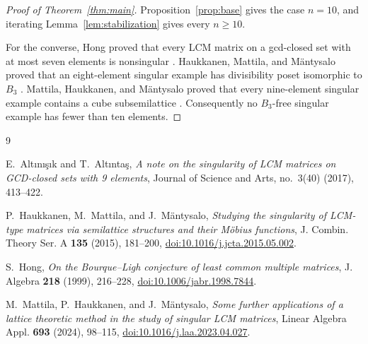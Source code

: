 \documentclass[11pt]{amsart}
\begin{document}
\begin{proof}[Proof of Theorem~\ref{thm:main}]
Proposition~\ref{prop:base} gives the case $n=10$, and iterating
Lemma~\ref{lem:stabilization} gives every $n\ge 10$.

For the converse, Hong proved that every LCM matrix on a gcd-closed
set with at most seven elements is nonsingular \cite{Hong1999}.
Haukkanen, Mattila, and M\"antysalo proved that an eight-element
singular example has divisibility poset isomorphic to $B_3$
\cite{HaukkanenMattilaMantysalo2015}. Mattila, Haukkanen, and
M\"antysalo proved that every nine-element singular example contains
a cube subsemilattice \cite{MattilaHaukkanenMantysalo2024}.
Consequently no $B_3$-free singular example has fewer than ten
elements.
\end{proof}

\begin{thebibliography}{9}

E.~Alt\i n\i\c{s}\i k and T.~Alt\i nta\c{s},
\emph{A note on the singularity of LCM matrices on GCD-closed sets
with 9 elements},
Journal of Science and Arts, no.~3(40) (2017), 413--422.

P.~Haukkanen, M.~Mattila, and J.~M\"antysalo,
\emph{Studying the singularity of LCM-type matrices via semilattice
structures and their M\"obius functions},
J. Combin. Theory Ser. A \textbf{135} (2015), 181--200,
\href{https://doi.org/10.1016/j.jcta.2015.05.002}
{doi:10.1016/j.jcta.2015.05.002}.

S.~Hong,
\emph{On the Bourque--Ligh conjecture of least common multiple
matrices},
J. Algebra \textbf{218} (1999), 216--228,
\href{https://doi.org/10.1006/jabr.1998.7844}
{doi:10.1006/jabr.1998.7844}.

M.~Mattila, P.~Haukkanen, and J.~M\"antysalo,
\emph{Some further applications of a lattice theoretic method in the
study of singular LCM matrices},
Linear Algebra Appl. \textbf{693} (2024), 98--115,
\href{https://doi.org/10.1016/j.laa.2023.04.027}
{doi:10.1016/j.laa.2023.04.027}.

\end{thebibliography}
\end{document}
